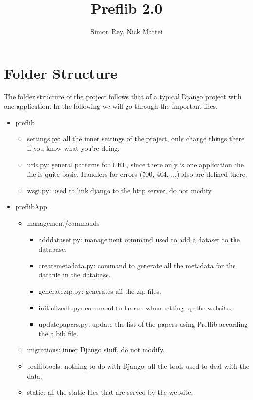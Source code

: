 \documentclass{article}
\begin{document}
	\title{Preflib 2.0}
	\author{Simon Rey, Nick Mattei}
	\maketitle
	
	\tableofcontents
	
	\section{Folder Structure}
	
	The folder structure of the project follows that of a typical Django project with one application. In the following we will go through the important files.
	
	\begin{itemize}
		\item preflib
		\begin{itemize}
			\item settings.py: all the inner settings of the project, only change things there if you know what you're doing.
			\item urls.py: general patterns for URL, since there only is one application the file is quite basic. Handlers for errors (500, 404, ...) also are defined there.
			\item wsgi.py: used to link django to the http server, do not modify.
		\end{itemize}
		\item preflibApp
		\begin{itemize}
			\item management/commands
			\begin{itemize}
				\item adddataset.py: management command used to add a dataset to the database.
				\item createmetadata.py: command to generate all the metadata for the datafile in the database.
				\item generatezip.py: generates all the zip files.
				\item initializedb.py: command to be run when setting up the website.
				\item updatepapers.py: update the list of the papers using Preflib according the a bib file.
			\end{itemize}
			\item migrations: inner Django stuff, do not modify.
			\item preflibtools: nothing to do with Django, all the tools used to deal with the data.
			\item static: all the static files that are served by the website.

\end{itemize}
\end{itemize}
\end{document}
